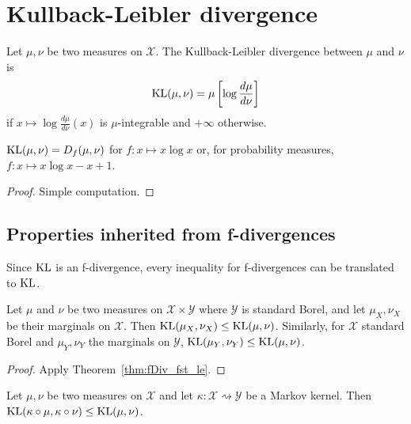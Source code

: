 \chapter{Kullback-Leibler divergence}

\begin{definition}
  \label{def:KL}
  Let $\mu, \nu$ be two measures on $\mathcal X$. The Kullback-Leibler divergence between $\mu$ and $\nu$ is
  \begin{align*}
  \mathrm{KL}(\mu, \nu) = \mu\left[\log \frac{d \mu}{d \nu}\right]
  \end{align*}
  if $x \mapsto \log \frac{d \mu}{d \nu}(x)$ is $\mu$-integrable and $+\infty$ otherwise.
\end{definition}

\begin{lemma}
  \label{lem:kl_eq_fDiv}
  $\mathrm{KL}(\mu, \nu) = D_f(\mu, \nu)$ for $f: x \mapsto x \log x$ or, for probability measures, $f: x \mapsto x \log x - x + 1$.
\end{lemma}

\begin{proof}
Simple computation.
\end{proof}

\section{Properties inherited from f-divergences}

Since $\mathrm{KL}$ is an f-divergence, every inequality for f-divergences can be translated to $\mathrm{KL}$.

\begin{theorem}[Marginals]
  \label{thm:kl_fst_le}
  Let $\mu$ and $\nu$ be two measures on $\mathcal X \times \mathcal Y$ where $\mathcal Y$ is standard Borel, and let $\mu_X, \nu_X$ be their marginals on $\mathcal X$.
  Then $\mathrm{KL}(\mu_X, \nu_X) \le \mathrm{KL}(\mu, \nu)$.
  Similarly, for $\mathcal X$ standard Borel and $\mu_Y, \nu_Y$ the marginals on $\mathcal Y$, $\mathrm{KL}(\mu_Y, \nu_Y) \le \mathrm{KL}(\mu, \nu)$.
\end{theorem}

\begin{proof}
Apply Theorem~\ref{thm:fDiv_fst_le}.
\end{proof}

\begin{theorem}
  \label{thm:kl_data_proc}
  Let $\mu, \nu$ be two measures on $\mathcal X$ and let $\kappa : \mathcal X \rightsquigarrow \mathcal Y$ be a Markov kernel.
  Then $\mathrm{KL}(\kappa \circ \mu, \kappa \circ \nu) \le \mathrm{KL}(\mu, \nu)$.
\end{theorem}

